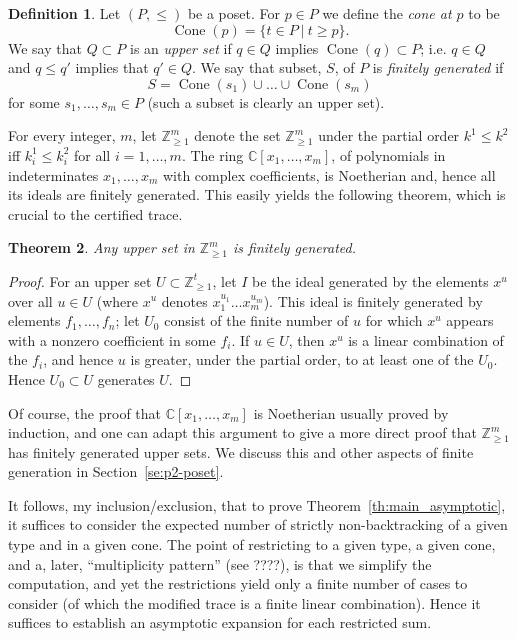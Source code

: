 \documentclass{memo-l}
\theoremstyle{plain}
\newtheorem{theorem}{Theorem}[section]
\theoremstyle{definition}
\newtheorem{definition}[theorem]{Definition}
\numberwithin{section}{chapter}
\numberwithin{equation}{chapter}
\newcommand{\integers}{{\mathbb Z}}
\newcommand{\complex}{{\mathbb C}}
\DeclareMathOperator{\Cone}{Cone}
\theoremstyle{plain}
\theoremstyle{definition}
\begin{document}
{\begin{definition} 
Let $(P,\le)$ be a poset.  For $p\in P$ we define
the {\em cone at $p$} to be
$$
\Cone(p) = \{ t\in P \ |\ t\ge p \}.
$$
We say that $Q\subset P$ is an {\em upper set} if
$q\in Q$ implies $\Cone(q)\subset P$; i.e. $q\in Q$ and $q\le q'$
implies that $q'\in Q$.
We say that subset, $S$, of $P$ is {\em finitely generated} if
$$
S = \Cone(s_1) \cup \ldots \cup \Cone(s_m)
$$
for some $s_1,\ldots,s_m\in P$ (such a subset is clearly an
upper set).
\end{definition}


For every integer, $m$, let $\integers_{\ge 1}^m$ denote the set
$\integers_{\ge 1}^m$ under the partial order $k^1\le k^2$
iff $k^1_i\le k^2_i$ for all $i=1,\ldots,m$.
The ring $\complex[x_1,\ldots,x_m]$, of polynomials in indeterminates
$x_1,\ldots,x_m$ with complex coefficients, is Noetherian and, hence
all its ideals are finitely generated.
This easily yields the following theorem, which is crucial to the
certified trace.
\begin{theorem} 
Any upper set in $\integers_{\ge 1}^m$ is finitely generated.
\end{theorem}
\begin{proof}
For an upper set $U\subset \integers_{\ge 1}^t$, let $I$ be the
ideal generated by the elements $x^u$ over all $u\in U$
(where $x^u$ denotes $x_1^{u_1}\ldots x_m^{u_m}$).  
This ideal
is finitely generated by elements $f_1,\ldots,f_n$; let $U_0$ consist
of the finite number of $u$ for which $x^u$ appears with a nonzero
coefficient in some $f_i$.
If $u\in U$, then $x^u$ is a linear combination of the $f_i$, and
hence $u$ is greater, under the partial order, to at least one of the
$U_0$.  Hence $U_0\subset U$ generates $U$.
\end{proof}
Of course, the proof that $\complex[x_1,\ldots,x_m]$ is 
Noetherian usually proved
by induction, and one can adapt this argument to give a more direct
proof that $\integers_{\ge 1}^m$ has finitely generated upper sets.
We discuss this and other aspects of finite generation in
Section~\ref{se:p2-poset}.

It follows, my inclusion/exclusion, that to prove
Theorem~\ref{th:main_asymptotic}, it suffices to consider the expected
number of strictly non-backtracking of a given type and in a given
cone.  The point of restricting to a given type, a given cone, and
a, later, ``multiplicity pattern'' (see ????), is that we simplify
the computation, and yet the restrictions yield only a finite number
of cases to consider (of which the modified trace is a finite linear
combination).  Hence it suffices to establish an asymptotic expansion
for each restricted sum.

}
\end{document}
